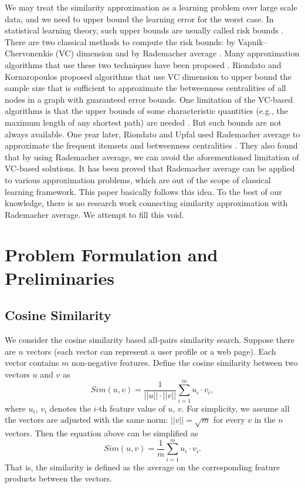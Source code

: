 \documentclass{article}
\begin{document}
We may treat the similarity approximation as a learning problem over large scale data, and we need to upper bound the learning error for the worst case. In statistical learning theory, such upper bounds are usually called risk bounds \cite{Vap13}. There are two classical methods to compute the risk bounds: by Vapnik–Chervonenkis (VC) dimension \cite{VLL94,Vap98,Vap13} and by Rademacher average \cite{Mohri09,BM02,BBM05}. Many approximation algorithms that use these two techniques have been proposed \cite{RK14,RK16,RU15,RU16}. Riondato and Kornaropoulos \cite{RK14,RK16} proposed algorithms that use VC dimension to upper bound the sample size that is sufficient to approximate the betweenness centralities \cite{Bran01} of all nodes in a graph with guaranteed error bounds. One limitation of the VC-based algorithms is that the upper bounds of some characteristic quantities (e.g., the maximum length of any shortest path) are needed \cite{RK14,RK16,RU16}. But such bounds are not always available. One year later, Riondato and Upfal used Rademacher average to approximate the frequent itemsets \cite{RU15} and betweenness centralities \cite{RU16}. They also found that by using Rademacher average, we can avoid the aforementioned limitation of VC-based solutions. It has been proved that Rademacher average can be applied to various approximation problems, which are out of the scope of classical learning framework. This paper basically follows this idea. To the best of our knowledge, there is no research work connecting similarity approximation with Rademacher average. We attempt to fill this void.

\section{Problem Formulation and Preliminaries}
\label{sec:pp}
\subsection{Cosine Similarity}
We consider the cosine similarity based all-pairs similarity search.
Suppose there are $n$ vectors (each vector can represent a user profile or a web page). Each vector contains $m$ non-negative features. Define the cosine similarity between two vectors $u$ and $v$ as
$$Sim(u,v) = \frac{1}{||u||\cdot||v||} \sum_{i=1}^m u_i\cdot v_i,$$
where $u_i$, $v_i$ denotes the $i$-th feature value of $u$, $v$.
For simplicity, we assume all the vectors are adjusted with the same norm: $||v|| = \sqrt{m}$ for every $v$ in the $n$ vectors. Then the equation above can be simplified as
$$Sim(u,v) = \frac{1}{m} \sum_{i=1}^m u_i\cdot v_i.$$
That is, the similarity is defined as the average on the corresponding feature products between the vectors. 
\end{document}
